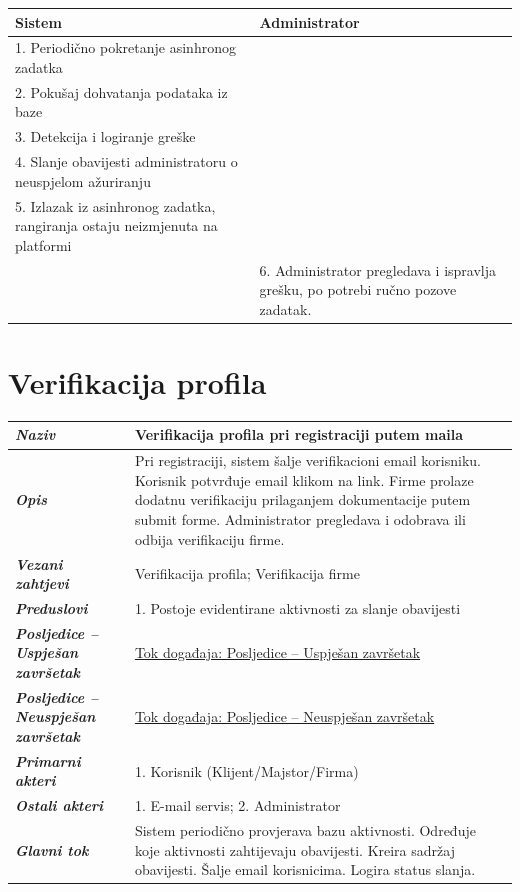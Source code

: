 \documentclass[12pt,a4paper]{article}
\newcommand{\usecase}[9]{%
\begin{longtable}{|L{4cm}|L{11cm}|}
\hline
\textbf{\textit{Naziv}} & \textbf{#1} \\
\hline
\textbf{\textit{Opis}} & #2 \\
\hline
\textbf{\textit{Vezani zahtjevi}} & #3 \\
\hline
\textbf{\textit{Preduslovi}} & #4 \\
\hline
\textbf{\textit{Posljedice -- Uspješan završetak}} & #5 \\
\hline
\textbf{\textit{Posljedice -- Neuspješan završetak}} & #6 \\
\hline
\textbf{\textit{Primarni akteri}} & #7 \\
\hline
\textbf{\textit{Ostali akteri}} & #8 \\
\hline
\textbf{\textit{Glavni tok}} & #9 \\
\hline
\end{longtable}%
}
\begin{document}
\begin{longtable}{|L{7.5cm}|L{7.5cm}|}
    \hline
    \textbf{Sistem}                                                              & \textbf{Administrator}                                                           \\
    . Periodično pokretanje asinhronog zadatka                                  &                                                                                  \\
    . Pokušaj dohvatanja podataka iz baze                                       &                                                                                  \\
    . Detekcija i logiranje greške                                              &                                                                                  \\
    . Slanje obavijesti administratoru o neuspjelom ažuriranju                  &                                                                                  \\
    . Izlazak iz asinhronog zadatka, rangiranja ostaju neizmjenuta na platformi &                                                                                  \\
    \hline
                                                                                 & 6. Administrator pregledava i ispravlja grešku, po potrebi ručno pozove zadatak. \\
    \hline
\end{longtable}




\section{Verifikacija profila}

\usecase
{Verifikacija profila pri registraciji putem maila}
{Pri registraciji, sistem šalje verifikacioni email korisniku. Korisnik potvrđuje email klikom na link. Firme prolaze dodatnu verifikaciju prilaganjem dokumentacije putem submit forme. Administrator pregledava i odobrava ili odbija verifikaciju firme.}
{Verifikacija profila; Verifikacija firme}
{1. Postoje evidentirane aktivnosti za slanje obavijesti}
{\hyperref[tok:5.1] {Tok događaja: Posljedice -- Uspješan završetak}}
{\hyperref[tok:5.2]{ Tok događaja: Posljedice -- Neuspješan završetak}}
{1. Korisnik (Klijent/Majstor/Firma)}
{1. E-mail servis; 2. Administrator}
{Sistem periodično provjerava bazu aktivnosti. Određuje koje aktivnosti zahtijevaju obavijesti. Kreira sadržaj obavijesti. Šalje email korisnicima. Logira status slanja.}
\end{document}
